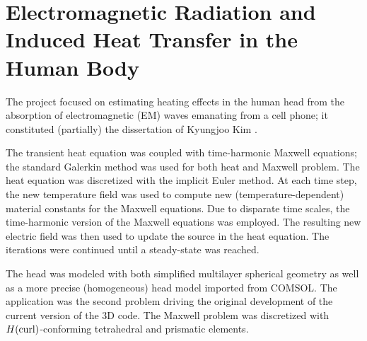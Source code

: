 \section{Electromagnetic Radiation and Induced Heat Transfer in the Human Body}
\label{sec:human-body}

The project focused on estimating heating effects in the human head from the absorption of electromagnetic (EM) waves emanating from a  cell phone; it constituted (partially) the dissertation of Kyungjoo Kim \cite{Kim2013phd}.

The transient heat equation was coupled with time-harmonic Maxwell equations; the standard Galerkin method was used for both heat and Maxwell problem. The heat equation was discretized with the implicit Euler method. At each time step, the new temperature field was used to compute new (temperature-dependent) material constants for the Maxwell equations. Due to disparate time scales, the time-harmonic version of the Maxwell equations was employed. The resulting new electric field was then used to update the source in the heat equation. The iterations were continued until a steady-state was reached.

The head was modeled with both simplified multilayer spherical geometry as well as a more precise (homogeneous) head model imported from COMSOL. The application was the second problem driving the original development of the current version of the \hp3D code. The Maxwell problem was discretized with $H(\text{curl})$-conforming tetrahedral and prismatic elements.

\clearpage

%


